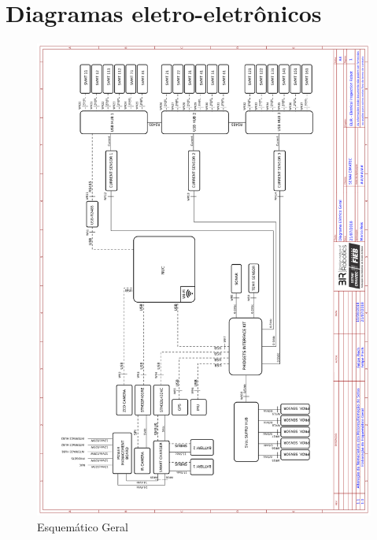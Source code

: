 
\chapter{Diagramas eletro-eletrônicos}
\label{Append:diagele}


    \begin{figure}[H]
	\centering
	\includegraphics[width=14cm]{Figures/EsquematicoGeral.png}
	\caption{Esquemático Geral} \label{EGERAL}
	\end{figure}
	
    \pagebreak
    
